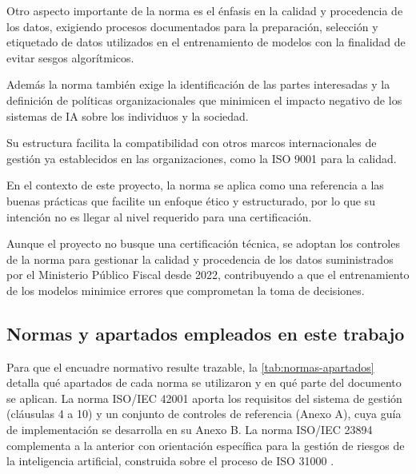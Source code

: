 Otro aspecto importante de la norma es el énfasis en la calidad y procedencia de los datos, exigiendo procesos documentados para la preparación, selección y etiquetado de datos utilizados en el entrenamiento de modelos con la finalidad de evitar sesgos algorítmicos.

Además la norma también exige la identificación de las partes interesadas y la definición de políticas organizacionales que minimicen el impacto negativo de los sistemas de IA sobre los individuos y la sociedad.

Su estructura facilita la compatibilidad con otros marcos internacionales de gestión ya establecidos en las organizaciones, como la ISO 9001 para la calidad.

En el contexto de este proyecto, la norma se aplica como una referencia a las buenas prácticas que facilite un enfoque ético y estructurado, por lo que su intención no es llegar al nivel requerido para una certificación.

Aunque el proyecto no busque una certificación técnica, se adoptan los controles de la norma para gestionar la calidad y procedencia de los datos suministrados por el Ministerio Público Fiscal desde 2022, contribuyendo a que el entrenamiento de los modelos minimice errores que comprometan la toma de decisiones.

\subsection{Normas y apartados empleados en este trabajo}\label{ssec:normas-apartados}

Para que el encuadre normativo resulte trazable, la \cref{tab:normas-apartados} detalla qué apartados de cada norma se utilizaron y en qué parte del documento se aplican. La norma ISO/IEC 42001 aporta los requisitos del sistema de gestión (cláusulas 4 a 10) y un conjunto de controles de referencia (Anexo A), cuya guía de implementación se desarrolla en su Anexo B. La norma ISO/IEC 23894 \parencite{iso23894} complementa a la anterior con orientación específica para la gestión de riesgos de la inteligencia artificial, construida sobre el proceso de ISO 31000 \parencite{iso31000}.

